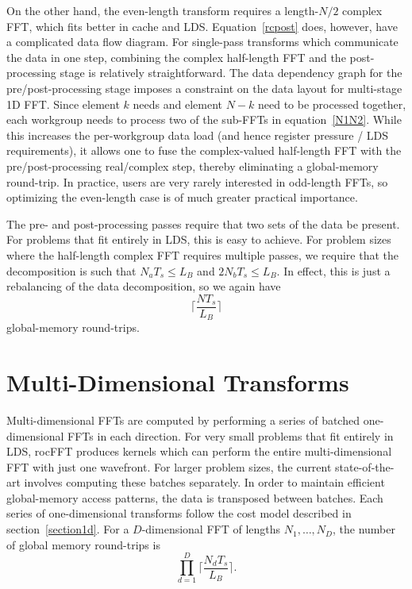 \documentclass[blind]{gtac}
\begin{document}
On the other hand, the even-length transform requires a length-$N/2$
complex FFT, which fits better in cache and LDS.
Equation~\eqref{rcpost} does, however, have a complicated data flow
diagram.  For single-pass transforms which communicate the data in one
step, combining the complex half-length FFT and the post-processing
stage is relatively straightforward.  The data dependency graph for
the pre/post-processing stage imposes a constraint on the data layout
for multi-stage 1D FFT.  Since element $k$ needs and element $N-k$
need to be processed together, each workgroup needs to process two of
the sub-FFTs in equation~\eqref{N1N2}. While this increases the
per-workgroup data load (and hence register pressure / LDS
requirements), it allows one to fuse the complex-valued half-length
FFT with the pre/post-processing real/complex step, thereby
eliminating a global-memory round-trip.  In practice, users are very
rarely interested in odd-length FFTs, so optimizing the even-length
case is of much greater practical importance.

The pre- and post-processing passes require that two sets of the data
be present.  For problems that fit entirely in LDS, this is easy to
achieve.  For problem sizes where the half-length complex FFT requires
multiple passes, we require that the decomposition is such that
$N_a T_s \leq L_B$ and $2N_b T_s \leq L_B$.  In effect, this is just
a rebalancing of the data decomposition, so we again have
\begin{dmath}
  \lceil\frac{N T_s}{L_B}\rceil
\end{dmath}
global-memory round-trips.
  
\section{Multi-Dimensional Transforms}

Multi-dimensional FFTs are computed by performing a series of batched
one-dimensional FFTs in each direction.  For very small problems that
fit entirely in LDS, rocFFT produces kernels which can perform the
entire multi-dimensional FFT with just one wavefront. For larger
problem sizes, the current state-of-the-art involves computing these
batches separately.  In order to maintain efficient global-memory
access patterns, the data is transposed between batches.  Each series
of one-dimensional transforms follow the cost model described in
section~\ref{section1d}.  For a $D$-dimensional FFT of lengths
$N_1,\dots,N_D$, the number of global memory round-trips is
\begin{dmath}
  \prod_{d=1}^{D}
  \lceil \frac{N_d T_s}{L_B} \rceil.
\end{dmath}
\end{document}
